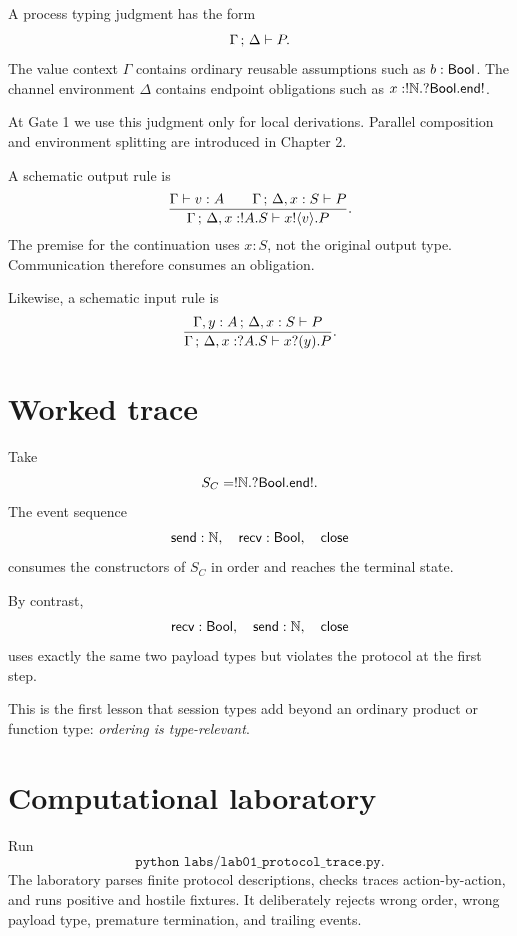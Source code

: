 \begin{formal}
A process typing judgment has the form
\[
   \Gamma\,;\,\Delta \vdash P.
\]
The value context \(\Gamma\) contains ordinary reusable assumptions such as \(b:\mathsf{Bool}\).
The channel environment \(\Delta\) contains endpoint obligations such as
\(x:!\mathbb{N}.?\mathsf{Bool}.\mathsf{end!}\).

At Gate 1 we use this judgment only for local derivations. Parallel composition and environment
splitting are introduced in Chapter 2.
\end{formal}

A schematic output rule is
\[
\frac{
  \Gamma\vdash v:A
  \qquad
  \Gamma\,;\,\Delta,x:S \vdash P
}{
  \Gamma\,;\,\Delta,x:!A.S \vdash x!\langle v\rangle.P
}.
\]
The premise for the continuation uses \(x:S\), not the original output type. Communication
therefore consumes an obligation.

Likewise, a schematic input rule is
\[
\frac{
  \Gamma,y:A\,;\,\Delta,x:S \vdash P
}{
  \Gamma\,;\,\Delta,x:?A.S \vdash x?(y).P
}.
\]

\section{Worked trace}

\begin{workedexample}
Take
\[
 S_C=!\mathbb{N}.?\mathsf{Bool}.\mathsf{end!}.
\]
The event sequence
\[
  \mathsf{send}:\mathbb{N},\quad
  \mathsf{recv}:\mathsf{Bool},\quad
  \mathsf{close}
\]
consumes the constructors of \(S_C\) in order and reaches the terminal state.

By contrast,
\[
  \mathsf{recv}:\mathsf{Bool},\quad
  \mathsf{send}:\mathbb{N},\quad
  \mathsf{close}
\]
uses exactly the same two payload types but violates the protocol at the first step.
\end{workedexample}

This is the first lesson that session types add beyond an ordinary product or function type:
\emph{ordering is type-relevant}.

\section{Computational laboratory}

\begin{labbox}
Run
\[
  \texttt{python labs/lab01_protocol_trace.py}.
\]
The laboratory parses finite protocol descriptions, checks traces action-by-action, and runs
positive and hostile fixtures. It deliberately rejects wrong order, wrong payload type,
premature termination, and trailing events.
\end{labbox}

